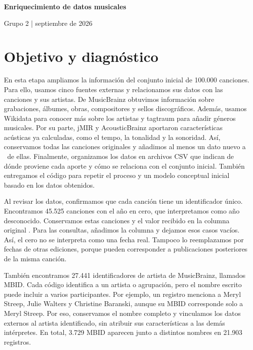 \documentclass[11pt,a4paper]{article}
\begin{document}
\begin{center}
{\LARGE\bfseries Enriquecimiento de datos musicales}\par
\vspace{4pt}{\normalsize Proyecto de Web Semántica MISIS -- Etapa 1}\par
{\small Grupo 2 \;|\; septiembre de 2026}
\end{center}
\vspace{-7pt}
\section{Objetivo y diagnóstico}
En esta etapa ampliamos la información del conjunto inicial de 100.000 canciones. Para ello, usamos cinco fuentes externas y relacionamos sus datos con las canciones y sus artistas. De MusicBrainz obtuvimos información sobre grabaciones, álbumes, obras, compositores y sellos discográficos. Además, usamos Wikidata para conocer más sobre los artistas y tagtraum para añadir géneros musicales. Por su parte, jMIR y AcousticBrainz aportaron características acústicas ya calculadas, como el tempo, la tonalidad y la sonoridad. Así, conservamos todas las canciones originales y añadimos al menos un dato nuevo a \TotalEnriquecidas\ de ellas. Finalmente, organizamos los datos en archivos CSV que indican de dónde proviene cada aporte y cómo se relaciona con el conjunto inicial. También entregamos el código para repetir el proceso y un modelo conceptual inicial basado en los datos obtenidos.

Al revisar los datos, confirmamos que cada canción tiene un identificador único. Encontramos 45.525 canciones con el año en cero, que interpretamos como año desconocido. Conservamos estas canciones y el valor recibido en la columna original . Para las consultas, añadimos la columna  y dejamos esos casos vacíos. Así, el cero no se interpreta como una fecha real. Tampoco lo reemplazamos por fechas de otras ediciones, porque pueden corresponder a publicaciones posteriores de la misma canción.

También encontramos 27.441 identificadores de artista de MusicBrainz, llamados MBID. Cada código identifica a un artista o agrupación, pero el nombre escrito puede incluir a varios participantes. Por ejemplo, un registro menciona a Meryl Streep, Julie Walters y Christine Baranski, aunque su MBID corresponde solo a Meryl Streep. Por eso, conservamos el nombre completo y vinculamos los datos externos al artista identificado, sin atribuir sus características a las demás intérpretes. En total, 3.729 MBID aparecen junto a distintos nombres en 21.903 registros.
\end{document}
